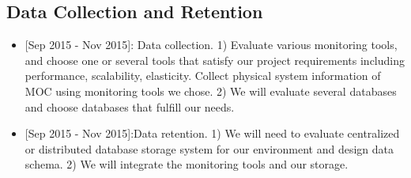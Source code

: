 \subsection{Data Collection and Retention}

\begin{itemize}
\item{[Sep 2015 - Nov 2015]:} Data collection. 1) Evaluate various monitoring tools, and choose one or several tools that satisfy our project requirements including performance, scalability, elasticity. Collect physical system information of MOC using monitoring tools we chose. 2) We will evaluate several databases and choose databases that fulfill our needs. 
\item{[Sep 2015 - Nov 2015]:}Data retention. 1) We will need to evaluate centralized or distributed database storage system for our environment and design data schema. 2) We will integrate the monitoring tools and our storage.
\end{itemize}